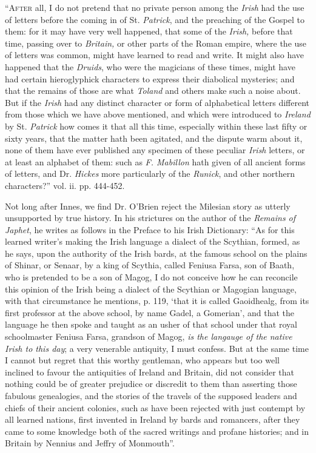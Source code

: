 \documentclass[11pt,oneside]{memoir}
\begin{document}
``\textsc{After} all, I do not pretend that no private person among the \textit{Irish} had the use of letters before the coming in of St. \textit{Patrick}, and the preaching of the Gospel to them: for it may have very well happened, that some of the \textit{Irish,} before that time, passing over to \textit{Britain,} or other parts of the Roman empire, where the use of letters was common, might have learned to read and write.
It might also have happened that the \textit{Druids}, who were the magicians of these times, might have had certain hieroglyphick characters to express their diabolical mysteries; and that the remains of those are what \textit{Toland} and others make such a noise about.
But if the \textit{Irish} had any distinct character or form of alphabetical letters different from those which we have above mentioned, and which were introduced to \textit{Ireland} by St. \textit{Patrick} how comes it that all this time, especially within these last fifty or sixty years, that the matter hath been agitated, and the dispute warm about it,  none of them have ever published any specimen of these peculiar \textit{Irish} letters, or at least an alphabet of them: such as \textit{F. Mabillon} hath given of all ancient forms of letters, and Dr. \textit{Hickes} more particularly of the \textit{Runick}, and other northern characters?'' vol. ii. pp. 444-452.

Not long after Innes, we find Dr. O'Brien reject the Milesian story as utterly unsupported by true history.
In his strictures on the author of the \textit{Remains of Japhet}, he writes as follows in the Preface to his Irish Dictionary:
``As for this learned writer's making the Irish language a dialect of the Scythian, formed, as he says, upon the authority of the Irish bards, at the famous school on the plains of Shinar, or Senaar, by a king of Scythia, called Feniusa Farsa, son of Baath, who is pretended to be a son of Magog, I do not conceive how he can reconcile this opinion of the Irish being a dialect of the Scythian or Magogian language, with that circumstance he mentions, p. 119, `that it is called Gaoidhealg, from its first professor at the above school, by name Gadel, a Gomerian', and that the language he then spoke and taught as an usher of that school under that royal schoolmaster Feniusa Farsa, grandson of Magog, \textit{is the langauge of the native Irish to this day}; a very venerable antiquity, I must confess.
But at the same time I cannot but regret that this worthy gentleman, who appears but too well inclined to favour the antiquities of Ireland and Britain, did not consider that nothing could be of greater prejudice or discredit to them than asserting those fabulous genealogies, and the stories of the travels of the supposed leaders and chiefs of their ancient colonies, such as have been rejected with just contempt by all learned nations, first invented in Ireland by bards and romancers, after they came to some knowledge both of the sacred writings and profane histories; and in Britain by Nennius and Jeffry of Monmouth''. 
\end{document}
